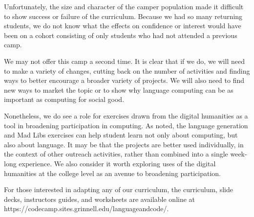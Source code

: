 Unfortunately, the size and character of the camper population made
it difficult to show success or failure of the curriculum.  Because
we had so many returning students, we do not know what the effects
on confidence or interest would have been on a cohort consisting
of only students who had not attended a previous camp.

We may not offer this camp a second time.  It is clear that if we
do, we will need to make a variety of changes, cutting back on the
number of activities and finding ways to better encourage a broader
variety of projects.  We will also need to find new ways to market
the topic or to show why language computing can be as important as
computing for social good.

Nonetheless, we do see a role for exercises drawn from the digital
humanities as a tool in broadening participation in computing.  As
noted, the language generation and Mad Libs exercises can help
student learn not only about computing, but also about language.
It may be that the projects are better used individually, in the
context of other outreach activities, rather than combined into a
single week-long experience.  We also consider it worth exploring
uses of the digital humanities at the college level as an avenue
to broadening participation.

For those interested in adapting any of our curriculum, the curriculum,
slide decks, instructors guides, and worksheets are available online
at https://codecamp.sites.grinnell.edu/languageandcode/.
